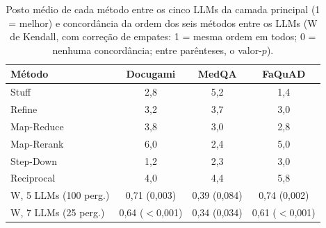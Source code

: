 \begin{table}[!t]
\centering
\footnotesize
\setlength{\tabcolsep}{4pt}
\caption{Posto médio de cada método entre os cinco LLMs da camada principal (1 = melhor) e concordância da ordem dos seis métodos entre os LLMs (W de Kendall, com correção de empates: 1 = mesma ordem em todos; 0 = nenhuma concordância; entre parênteses, o valor-$p$).}
\label{tab:concordancia}
\begin{tabular}{lccc}
\toprule
Método & Docugami & MedQA & FaQuAD \\
\midrule
Stuff & 2,8 & 5,2 & 1,4 \\
Refine & 3,2 & 3,7 & 3,0 \\
Map-Reduce & 3,8 & 3,0 & 2,8 \\
Map-Rerank & 6,0 & 2,4 & 5,0 \\
Step-Down & 1,2 & 2,3 & 3,0 \\
Reciprocal & 4,0 & 4,4 & 5,8 \\
\midrule
W, 5 LLMs (100 perg.) & 0,71 (0,003) & 0,39 (0,084) & 0,74 (0,002) \\
W, 7 LLMs (25 perg.) & 0,64 ($<$0,001) & 0,34 (0,034) & 0,61 ($<$0,001) \\
\bottomrule
\end{tabular}
\end{table}
